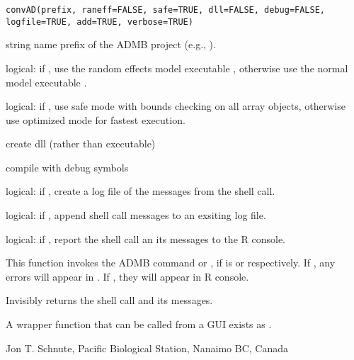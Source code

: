\documentclass[letterpaper]{book}
\begin{document}
%
\begin{Usage}
\begin{verbatim}
convAD(prefix, raneff=FALSE, safe=TRUE, dll=FALSE, debug=FALSE, logfile=TRUE, add=TRUE, verbose=TRUE)
\end{verbatim}
\end{Usage}
%
\begin{Arguments}
\begin{ldescription}
\item[\code{prefix}] string name prefix of the ADMB project (e.g., ).
\item[\code{raneff}] logical: if , use the random effects model executable
, otherwise use the normal model executable .
\item[\code{safe}] logical: if , use safe mode with bounds checking on all
array objects, otherwise use optimized mode for fastest execution.
\item[\code{dll}] create dll (rather than executable)
\item[\code{debug}] compile with debug symbols
\item[\code{logfile}] logical: if , create a log file of the messages from the shell call.
\item[\code{add}] logical: if , append shell call messages to an exsiting log file.
\item[\code{verbose}] logical: if , report the shell call an its messages to the R console.
\end{ldescription}
\end{Arguments}
%
\begin{Details}\relax
This function invokes the ADMB command  or ,
if  is  or  respectively. If ,
any errors will appear in . If ,
they will appear in R console.
\end{Details}
%
\begin{Value}
Invisibly returns the shell call and its messages.
\end{Value}
%
\begin{Note}\relax
A wrapper function that can be called from a GUI exists as .
\end{Note}
%
\begin{Author}\relax
 Jon T. Schnute, Pacific Biological Station, Nanaimo BC, Canada 
\end{Author}
\end{document}
